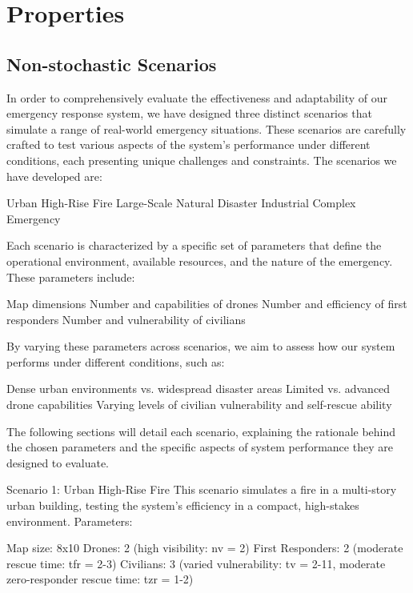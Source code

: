 
\section{Properties}

\subsection{Non-stochastic Scenarios}

In order to comprehensively evaluate the effectiveness and adaptability of our emergency response system, we have designed three distinct scenarios that simulate a range of real-world emergency situations. These scenarios are carefully crafted to test various aspects of the system's performance under different conditions, each presenting unique challenges and constraints.
The scenarios we have developed are:

Urban High-Rise Fire
Large-Scale Natural Disaster
Industrial Complex Emergency

Each scenario is characterized by a specific set of parameters that define the operational environment, available resources, and the nature of the emergency. These parameters include:

Map dimensions
Number and capabilities of drones
Number and efficiency of first responders
Number and vulnerability of civilians

By varying these parameters across scenarios, we aim to assess how our system performs under different conditions, such as:

Dense urban environments vs. widespread disaster areas
Limited vs. advanced drone capabilities
Varying levels of civilian vulnerability and self-rescue ability

The following sections will detail each scenario, explaining the rationale behind the chosen parameters and the specific aspects of system performance they are designed to evaluate.

Scenario 1: Urban High-Rise Fire
This scenario simulates a fire in a multi-story urban building, testing the system's efficiency in a compact, high-stakes environment.
Parameters:

Map size: 8x10
Drones: 2 (high visibility: nv = 2)
First Responders: 2 (moderate rescue time: tfr = 2-3)
Civilians: 3 (varied vulnerability: tv = 2-11, moderate zero-responder rescue time: tzr = 1-2)

